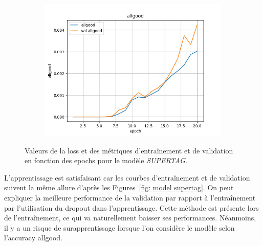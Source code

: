 \documentclass[a4paper]{article}
\begin{document}
\begin{figure}[H]
\begin{subfigure}{0.32\textwidth}
    \end{subfigure}
    \begin{subfigure}{0.32\textwidth}
        \centering
        \includegraphics[width=\linewidth]{../logs/supertag/allgood.png}
    \end{subfigure}
    \caption{Valeurs de la loss et des métriques d'entraînement et de validation en fonction des epochs 
            pour le modèle \textit{SUPERTAG}.}
    \label{fig: results supertag}
\end{figure}

L'apprentissage est satisfaisant car les courbes d'entraînement et de validation suivent la même allure d'après les 
Figures~\ref{fig: model supertag}. 
On peut expliquer la meilleure performance
de la validation par rapport à l'entraînement par l'utilisation du dropout dans l'apprentissage. Cette méthode est présente lors
de l'entraînement, ce qui va naturellement baisser ses performances. 
Néanmoins, il y a un risque de surapprentissage lorsque l'on considère le modèle selon l'accuracy allgood. 
\end{document}
